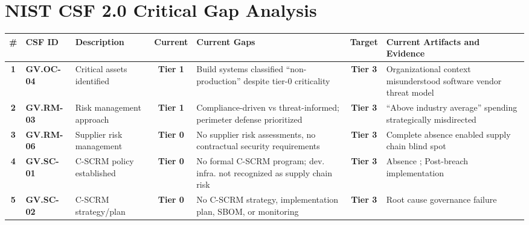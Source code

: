 \clearpage
\section{NIST CSF 2.0 Critical Gap Analysis}
\label{app:csf}

\newcommand{\tierzero}{\cellcolor{red!20}\textbf{Tier 0}}
\newcommand{\tierone}{\cellcolor{orange!20}\textbf{Tier 1}}
\newcommand{\tierthree}{\cellcolor{green!20}\textbf{Tier 3}}

\begin{table}[h]
    \centering
    \small
    \renewcommand{\arraystretch}{1.4}
    \begin{tabularx}{\linewidth}{>{\bfseries}c >{\bfseries}l >{\raggedright\arraybackslash}X c >{\raggedright\arraybackslash}X c >{\raggedright\arraybackslash}X}
        \toprule
        \# & CSF ID & Description & Current & Current Gaps & Target & Current Artifacts and Evidence \\
        \midrule
        1 & GV.OC-04 & Critical assets identified & \tierone & Build systems classified ``non-production'' despite tier-0 criticality & \tierthree & Organizational context misunderstood software vendor threat model \cite{boyens_cybersecurity_2022} \\
        
        2 & GV.RM-03 & Risk management approach & \tierone & Compliance-driven vs threat-informed; perimeter defense prioritized & \tierthree & ``Above industry average'' spending strategically misdirected \cite{nagle_solarwinds_2023} \\
        
        3 & GV.RM-06 & Supplier risk management & \tierzero & No supplier risk assessments, no contractual security requirements & \tierthree & Complete absence enabled supply chain blind spot \cite{boyens_cybersecurity_2022} \\
        
        4 & GV.SC-01 & C-SCRM policy established & \tierzero & No formal C-SCRM program; dev. infra. not recognized as supply chain risk & \tierthree & Absence \cite{us_open_2021}; Post-breach implementation \cite{nagle_solarwinds_2023} \\
        
        5 & GV.SC-02 & C-SCRM strategy/plan & \tierzero & No C-SCRM strategy, implementation plan, SBOM, or monitoring & \tierthree & Root cause governance failure \cite{boyens_cybersecurity_2022} \\
        

\end{tabularx}
\end{table}
